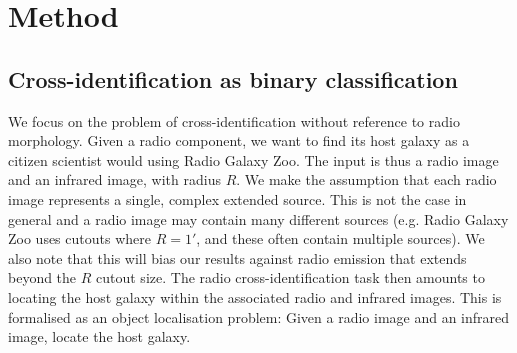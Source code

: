 \documentclass[fleqn,usenatbib,usedcolumn]{mnras}
\begin{document}
  \section{Method}\label{method}

  \subsection{Cross-identification as binary
  classification}\label{cross-identification-as-binary-classification}

    We focus on the problem of cross-identification without reference to radio
    morphology. Given a radio component, we want to find its host galaxy as a
    citizen scientist would using Radio Galaxy Zoo. The input is thus a radio
    image and an infrared image, with radius \(R\). We make the assumption
    that each radio image represents a single, complex extended source. This
    is not the case in general and a radio image may contain many different
    sources (e.g. Radio Galaxy Zoo uses cutouts where \(R = 1'\), and these
    often contain multiple sources). We also note that this will bias our
    results against radio emission that extends beyond the \(R\) cutout size.
    The radio cross-identification task then amounts to locating the host
    galaxy within the associated radio and infrared images. This is formalised
    as an object localisation problem: Given a radio image and an infrared
    image, locate the host galaxy.
\end{document}
